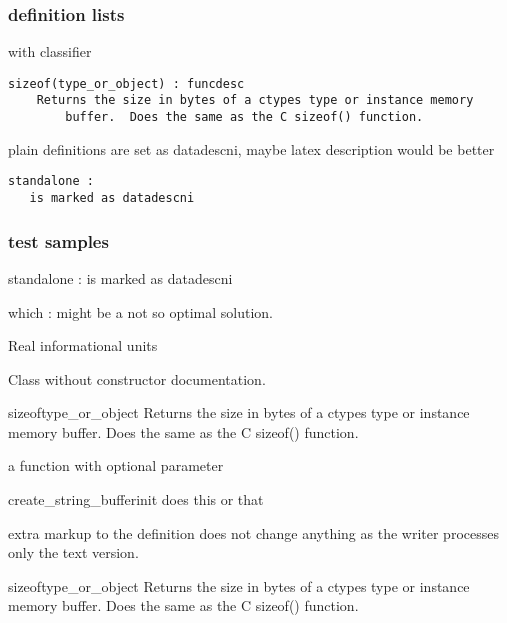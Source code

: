 \subsubsection{definition lists\label{-definition-lists}}

with classifier
\begin{verbatim}
sizeof(type_or_object) : funcdesc
    Returns the size in bytes of a ctypes type or instance memory
        buffer.  Does the same as the C sizeof() function.
\end{verbatim}

plain definitions are set as datadescni, maybe latex description would
be better
\begin{verbatim}
standalone :
   is marked as datadescni
\end{verbatim}


\subsubsection{test samples\label{-test-samples}}

\begin{datadescni}{standalone :}
is marked as datadescni
\end{datadescni}

\begin{datadescni}{which :}
might be a not so optimal solution.
\end{datadescni}

Real informational units

\begin{classdesc*}{Class}
without constructor documentation.
\end{classdesc*}

\begin{funcdesc}{sizeof}{type_or_object}
Returns the size in bytes of a ctypes type or instance memory
buffer.  Does the same as the C sizeof() function.
\end{funcdesc}

a function with optional parameter

\begin{funcdesc}{create_string_buffer}{init}
does this or that
\end{funcdesc}

extra markup to the definition does not change anything as the writer processes
only the text version.

\begin{funcdesc}{sizeof}{type_or_object}
Returns the size in bytes of a ctypes type or instance memory
buffer.  Does the same as the C sizeof() function.
\end{funcdesc}


